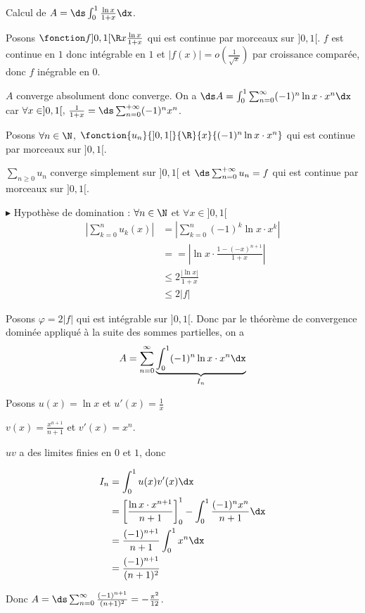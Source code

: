 \begin{exemple}
    Calcul de $A = \ds \int_0^1 \frac{\ln x}{1 + x} \dx$.

    Posons $\fonction f{]0, 1[}{\R}{x}{\frac{\ln x}{1 + x}}$ 
    qui est continue par morceaux sur $]0, 1[$. $f$ est continue en $1$ donc intégrable en $1$
    et $|f(x)| = o\left(\frac 1 {\sqrt x} \right)$ par croissance comparée, donc $f$ inégrable en $0$. 

    $A$ converge absolument donc converge. On a $\ds A = \int_{0}^{1 } \sum_{n = 0}^{\infty} (-1)^n \ln x \cdot x^n \dx$
    car $\forall x \in ]0, 1[, \, \frac 1 {1 + x} = \ds \sum_{n = 0}^{+ \infty} (-1)^n x^n$.

    Posons $\forall n \in \N$, $\fonction {u_n}{]0, 1[}{\R}{x}{(-1)^n \ln x \cdot x^n}$ qui est continue par morceaux sur $]0, 1[$.

    $\sum_{n \geqslant 0} u_n$ converge simplement sur $]0, 1[$ et $\ds \sum_{n = 0}^{+ \infty} u_n = f$ qui est continue par morceaux sur $]0, 1[$.

    \avspace $\blacktriangleright$ Hypothèse de domination : $\forall n \in \N$ et $\forall 
    x \in ]0, 1[$\begin{align}
        \left| \sum_{k = 0 }^{n } u_k(x) \right| & = \left| \sum_{k = 0}^{n } (-1)^k \ln x \cdot x^k \right| \\
        & == \left| \ln x \cdot \frac{1 - (-x)^{n + 1}}{1 + x} \right| \\
        & \leqslant 2 \frac{|\ln x|}{1+x} \\
        & \leqslant 2 |f|
    \end{align}

    Posons $\varphi = 2 |f|$ qui est intégrable sur $]0, 1[$. Donc par le théorème de convergence dominée 
    appliqué à la suite des sommes partielles, on a 
    $$A = \sum_{n=0}^{\infty} \underbrace{\int_{0}^{1} (-1)^n \ln x \cdot x^n \dx}_{I_n}$$

    Posons $u(x) = \ln x$ et $u'(x) = \frac 1 x$ 

    $v(x) = \frac{x^{n + 1}}{n + 1}$ et $v'(x) = x^n$.

    $uv$ a des limites finies en $0$ et $1$, donc 
    
    \begin{align}
    I_n & = \int_0^1 u(x) v'(x) \dx \\
    & = \left[ \frac{\ln x \cdot x^{n+1}}{n + 1} \right]_0^1 - \int_0^1 \frac{(-1)^nx^n}{n+1} \dx \\
    & = \frac{(-1)^{n+1}}{n + 1} \int_0^1 x^n \dx \\
    & = \frac{(-1)^{n+1}}{(n + 1)^2}
    \end{align}

    Donc $A = \ds \sum_{n = 0 }^{\infty} \frac{(-1)^{n+1}}{(n + 1)^2} = - \frac{\pi^2}{12}$.

\end{exemple}

